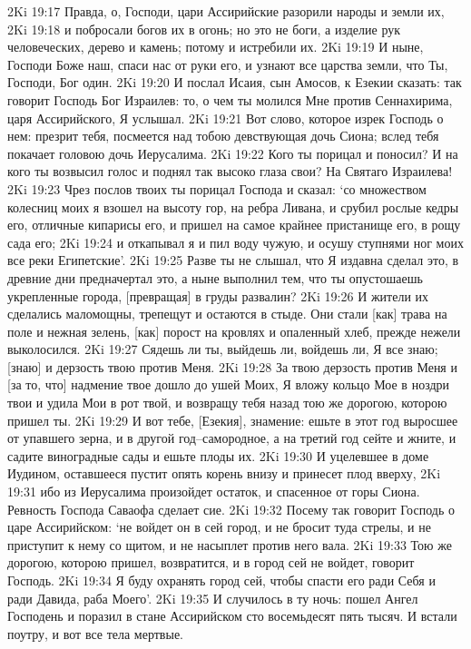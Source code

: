 2Ki 19:17  Правда, о, Господи, цари Ассирийские разорили народы и земли их,
2Ki 19:18  и побросали богов их в огонь; но это не боги, а изделие рук человеческих, дерево и камень; потому и истребили их.
2Ki 19:19  И ныне, Господи Боже наш, спаси нас от руки его, и узнают все царства земли, что Ты, Господи, Бог один.
2Ki 19:20  И послал Исаия, сын Амосов, к Езекии сказать: так говорит Господь Бог Израилев: то, о чем ты молился Мне против Сеннахирима, царя Ассирийского, Я услышал.
2Ki 19:21  Вот слово, которое изрек Господь о нем: презрит тебя, посмеется над тобою девствующая дочь Сиона; вслед тебя покачает головою дочь Иерусалима.
2Ki 19:22  Кого ты порицал и поносил? И на кого ты возвысил голос и поднял так высоко глаза свои? На Святаго Израилева!
2Ki 19:23  Чрез послов твоих ты порицал Господа и сказал: `со множеством колесниц моих я взошел на высоту гор, на ребра Ливана, и срубил рослые кедры его, отличные кипарисы его, и пришел на самое крайнее пристанище его, в рощу сада его;
2Ki 19:24  и откапывал я и пил воду чужую, и осушу ступнями ног моих все реки Египетские'.
2Ki 19:25  Разве ты не слышал, что Я издавна сделал это, в древние дни предначертал это, а ныне выполнил тем, что ты опустошаешь укрепленные города, [превращая] в груды развалин?
2Ki 19:26  И жители их сделались маломощны, трепещут и остаются в стыде. Они стали [как] трава на поле и нежная зелень, [как] порост на кровлях и опаленный хлеб, прежде нежели выколосился.
2Ki 19:27  Сядешь ли ты, выйдешь ли, войдешь ли, Я все знаю; [знаю] и дерзость твою против Меня.
2Ki 19:28  За твою дерзость против Меня и [за то, что] надмение твое дошло до ушей Моих, Я вложу кольцо Мое в ноздри твои и удила Мои в рот твой, и возвращу тебя назад тою же дорогою, которою пришел ты.
2Ki 19:29  И вот тебе, [Езекия], знамение: ешьте в этот год выросшее от упавшего зерна, и в другой год--самородное, а на третий год сейте и жните, и садите виноградные сады и ешьте плоды их.
2Ki 19:30  И уцелевшее в доме Иудином, оставшееся пустит опять корень внизу и принесет плод вверху,
2Ki 19:31  ибо из Иерусалима произойдет остаток, и спасенное от горы Сиона. Ревность Господа Саваофа сделает сие.
2Ki 19:32  Посему так говорит Господь о царе Ассирийском: `не войдет он в сей город, и не бросит туда стрелы, и не приступит к нему со щитом, и не насыплет против него вала.
2Ki 19:33  Тою же дорогою, которою пришел, возвратится, и в город сей не войдет, говорит Господь.
2Ki 19:34  Я буду охранять город сей, чтобы спасти его ради Себя и ради Давида, раба Моего'.
2Ki 19:35  И случилось в ту ночь: пошел Ангел Господень и поразил в стане Ассирийском сто восемьдесят пять тысяч. И встали поутру, и вот все тела мертвые.
